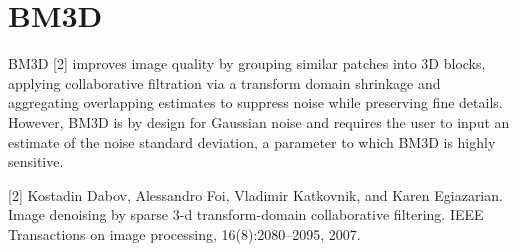 \chapter{BM3D}

BM3D [2] improves image quality by grouping similar patches into 3D
blocks, applying collaborative filtration via a transform domain
shrinkage and aggregating overlapping estimates to suppress noise
while preserving fine details.  However, BM3D is by design for
Gaussian noise and requires the user to input an estimate of the noise
standard deviation, a parameter to which BM3D is highly sensitive. %

[2] Kostadin Dabov, Alessandro Foi, Vladimir Katkovnik, and Karen Egiazarian. Image denoising by sparse 3-d
transform-domain collaborative filtering. IEEE Transactions on image processing, 16(8):2080–2095, 2007.

